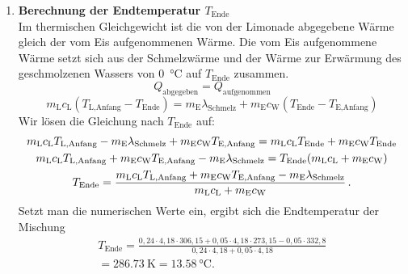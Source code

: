 \documentclass[ngerman]{scrreprt}
\newenvironment{loesungbox}[1]
  {\needspace{5\baselineskip}\begin{loesungboxstyle}[frametitle={#1}]}
  {\end{loesungboxstyle}}
\begin{document}
\begin{loesungbox}{Lösung zu \Cref{aufg:eiswuerfel_limo}}
\begin{enumerate}
    \item \textbf{Berechnung der Endtemperatur $T_{\text{Ende}}$} \\
    Im thermischen Gleichgewicht ist die von der Limonade abgegebene Wärme gleich der vom Eis aufgenommenen Wärme. Die vom Eis aufgenommene Wärme setzt sich aus der Schmelzwärme und der Wärme zur Erwärmung des geschmolzenen Wassers von \SI{0}{\celsius} auf $T_{\text{Ende}}$ zusammen.
    \begin{equation}\label{eq: waermebilanz_limo}
        Q_{\text{abgegeben}} = Q_{\text{aufgenommen}}
    \end{equation}
    \begin{equation}
        m_{\text{L}} c_{\text{L}} (T_{\text{L,Anfang}} - T_{\text{Ende}}) = m_{\text{E}} \lambda_{\text{Schmelz}} + m_{\text{E}} c_{\text{W}} (T_{\text{Ende}} - T_{\text{E,Anfang}})
    \end{equation}
    Wir lösen die Gleichung nach $T_\text{Ende}$ auf:
    \begin{gather}
        m_{\text{L}} c_{\text{L}} T_{\text{L,Anfang}} - m_{\text{E}} \lambda_{\text{Schmelz}} + m_{\text{E}} c_{\text{W}} T_{\text{E,Anfang}} = m_{\text{L}} c_{\text{L}} T_{\text{Ende}} + m_{\text{E}} c_{\text{W}} T_{\text{Ende}} \nonumber\\
        m_{\text{L}} c_{\text{L}} T_{\text{L,Anfang}} + m_{\text{E}} c_{\text{W}} T_{\text{E,Anfang}} - m_{\text{E}} \lambda_{\text{Schmelz}} = T_{\text{Ende}} (m_{\text{L}} c_{\text{L}} + m_{\text{E}} c_{\text{W}}) \nonumber\\
        T_{\text{Ende}} = \frac{m_{\text{L}} c_{\text{L}} T_{\text{L,Anfang}} + m_{\text{E}} c_{\text{W}} T_{\text{E,Anfang}} - m_{\text{E}} \lambda_{\text{Schmelz}}}{m_{\text{L}} c_{\text{L}} + m_{\text{E}} c_{\text{W}}} \,.
    \end{gather}
    Setzt man die numerischen Werte ein, ergibt sich die Endtemperatur der Mischung
    \begin{multline*}
        T_\text{Ende} = \frac{0,24 \cdot 4,18 \cdot 306,15 + 0,05 \cdot 4,18 \cdot 273,15 - 0,05\cdot 332,8}{0,24\cdot 4,18 + 0,05\cdot 4,18} \\
        =\SI{286.73}{\kelvin} = \SI{13.58}{\celsius}.
    \end{multline*}
\end{enumerate}
\end{loesungbox}
\end{document}
